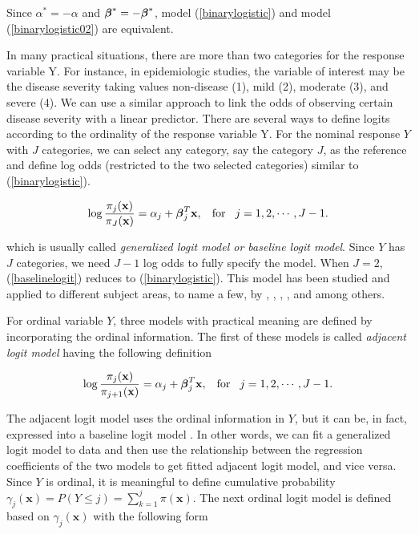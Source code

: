 \documentclass[12]{interact}
\theoremstyle{plain}%
\theoremstyle{definition}
\theoremstyle{remark}
\begin{document}
Since $\alpha^*=-\alpha$ and ${\mbox{\boldmath $\beta$}}^* = - {\mbox{\boldmath $\beta$}}^{*}$, model (\ref{binarylogistic}) and model (\ref{binarylogistic02}) are equivalent.

In many practical situations, there are more than two categories for the response variable Y. For instance, in epidemiologic studies, the variable of interest may be the disease severity taking values non-disease (1), mild (2), moderate (3), and severe (4). We can use a similar approach to link the odds of observing certain disease severity with a linear predictor. There are several ways to define logits according to the ordinality of the response variable Y. For the nominal response $Y$ with $J$ categories,  we can select any category, say the category $J$, as the reference and define log odds (restricted to the two selected categories) similar to (\ref{binarylogistic}).

\begin{equation}
	\log \frac{\pi_j(\mathbf{x})}{\pi_J(\mathbf{x})}=\alpha_j +  {\mbox{\boldmath $\beta$}}_j^{T}\mathbf{x}, \hspace{3mm}\mbox{for}\hspace{3mm} j =1, 2, \cdots, J-1. \label{baselinelogit}
\end{equation}

which is usually called {\em generalized logit model or baseline logit model}.  Since $Y$ has $J$ categories, we need $J-1$ log odds to fully specify the model. When $J=2$, (\ref{baselinelogit}) reduces to (\ref{binarylogistic}). This model has been studied and applied to different subject areas, to name a few, by \citep{MCCULLAGH-OrdinalReg-Discussion-1980}, \citep{Anderson-JRSSS-1984}, \citep{Begg-Gray-Biometrika-1984}, \citep{Fienberg-book-1978}, and among others.

For ordinal variable $Y$, three models with practical meaning are defined by incorporating the ordinal information. The first of these models is called {\em adjacent logit model} having the following definition

\begin{equation}
	\log \frac{\pi_j(\mathbf{x})}{\pi_{j+1}(\mathbf{x})}=\alpha_j +  {\mbox{\boldmath $\beta$}}_j^{T}\mathbf{x}, \hspace{3mm}\mbox{for}\hspace{3mm} j =1, 2, \cdots, J-1. \label{adjacentlogit}
\end{equation}

The adjacent logit model uses the ordinal information in $Y$, but it can be, in fact, expressed into a baseline logit model  \citep{Aggresti-CDA-2002}. In other words, we can fit a generalized logit model to data and then use the relationship between the regression coefficients of the two models to get fitted adjacent logit model, and vice versa. Since $Y$ is ordinal, it is meaningful to define cumulative probability $\gamma_j(\mathbf{x})=P(Y \le j)=\sum_{k=1}^j\pi(\mathbf{x})$. The next ordinal logit model is defined based on $\gamma_j(\mathbf{x})$ with the following form
\end{document}
